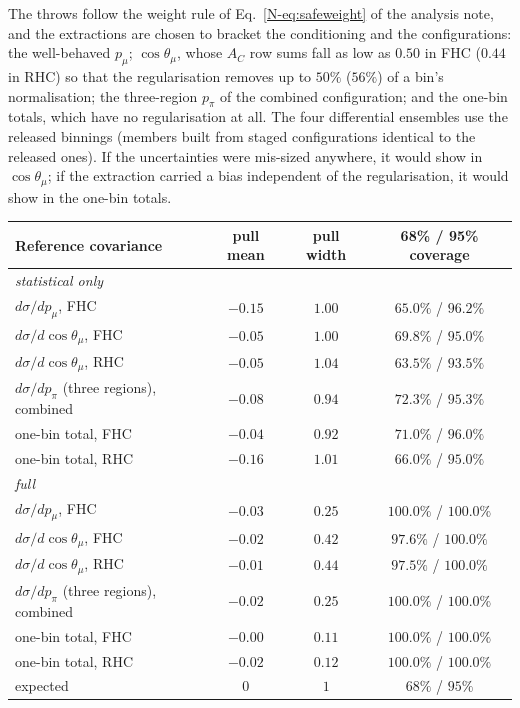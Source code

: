 \documentclass[11pt,a4paper]{article}
\newcommand{\noteref}[2]{#1~\ref{N-#2} of the analysis note}
\begin{document}
The throws follow the weight rule of \noteref{Eq.}{eq:safeweight}, and the extractions are
chosen to bracket the conditioning and the configurations: the well-behaved $p_\mu$;
$\cos\theta_\mu$, whose $A_C$ row sums fall as low as $0.50$ in FHC ($0.44$ in RHC) so that the
regularisation removes up to $50\%$ ($56\%$) of a bin's normalisation; the three-region $p_\pi$ of
the combined configuration; and the one-bin totals, which have no regularisation at all. The four
differential ensembles use the released binnings (members built from staged configurations
identical to the released ones). If the uncertainties were mis-sized anywhere, it would show in
$\cos\theta_\mu$; if the extraction carried a bias independent of the regularisation, it would
show in the one-bin totals.

\begin{center}
\small
\begin{tabular}{lccc}
\toprule
Reference covariance & pull mean & pull width & 68\% / 95\% coverage \\
\midrule
\multicolumn{4}{l}{\emph{statistical only}}\\
$d\sigma/dp_\mu$, FHC                    & $-0.15$ & $1.00$ & $65.0\%$ / $96.2\%$ \\
$d\sigma/d\cos\theta_\mu$, FHC           & $-0.05$ & $1.00$ & $69.8\%$ / $95.0\%$ \\
$d\sigma/d\cos\theta_\mu$, RHC           & $-0.05$ & $1.04$ & $63.5\%$ / $93.5\%$ \\
$d\sigma/dp_\pi$ (three regions), combined & $-0.08$ & $0.94$ & $72.3\%$ / $95.3\%$ \\
one-bin total, FHC                       & $-0.04$ & $0.92$ & $71.0\%$ / $96.0\%$ \\
one-bin total, RHC                       & $-0.16$ & $1.01$ & $66.0\%$ / $95.0\%$ \\
\midrule
\multicolumn{4}{l}{\emph{full}}\\
$d\sigma/dp_\mu$, FHC                    & $-0.03$ & $0.25$ & $100.0\%$ / $100.0\%$ \\
$d\sigma/d\cos\theta_\mu$, FHC           & $-0.02$ & $0.42$ & $97.6\%$ / $100.0\%$ \\
$d\sigma/d\cos\theta_\mu$, RHC           & $-0.01$ & $0.44$ & $97.5\%$ / $100.0\%$ \\
$d\sigma/dp_\pi$ (three regions), combined & $-0.02$ & $0.25$ & $100.0\%$ / $100.0\%$ \\
one-bin total, FHC                       & $-0.00$ & $0.11$ & $100.0\%$ / $100.0\%$ \\
one-bin total, RHC                       & $-0.02$ & $0.12$ & $100.0\%$ / $100.0\%$ \\
\midrule
expected                & $0$     & $1$    & $68\%$ / $95\%$ \\
\bottomrule
\end{tabular}
\end{center}
\end{document}
